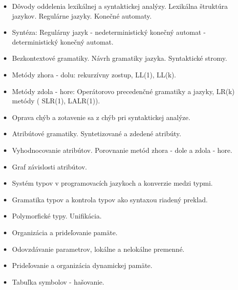 \documentclass[a4paper]{report}
\begin{document}
\begin{zadanie}
\begin{itemize}
 \item Dôvody oddelenia lexikálnej a syntaktickej analýzy. Lexikálna štruktúra jazykov. Regulárne jazyky. Konečné automaty.
 \item Syntéza: Regulárny jazyk - nedeterministický konečný automat - deterministický konečný automat.
\end{itemize}
\end{zadanie}

\begin{zadanie}
\begin{itemize}
 \item Bezkontextové gramatiky. Návrh gramatiky jazyka. Syntaktické stromy.
 \item Metódy zhora - dolu: rekurzívny zostup, LL(1), LL(k).
 \item Metódy zdola - hore: Operátorovo precedenčné gramatiky a jazyky, LR(k) metódy ( SLR(1), LALR(1)).
 \item Oprava chýb a zotavenie sa z chýb pri syntaktickej analýze.
\end{itemize}
\end{zadanie}

\begin{zadanie}
\begin{itemize}
 \item Atribútové gramatiky. Syntetizované a zdedené atribúty.
 \item Vyhodnocovanie atribútov. Porovnanie metód zhora - dole a zdola - hore.
 \item Graf závislosti atribútov.
\end{itemize}
\end{zadanie}

\begin{zadanie}
\begin{itemize}
 \item Systém typov v programovacích jazykoch a konverzie medzi typmi.
 \item Gramatika typov a kontrola typov ako syntaxou riadený preklad.
 \item Polymorfické typy. Unifikácia.
\end{itemize}
\end{zadanie}

\begin{zadanie}
\begin{itemize}
 \item Organizácia a prideľovanie pamäte.
 \item Odovzdávanie parametrov, lokálne a nelokálne premenné.
 \item Prideľovanie a organizácia dynamickej pamäte.
 \item Tabuľka symbolov - hašovanie.
\end{itemize}
\end{zadanie}
\end{document}
